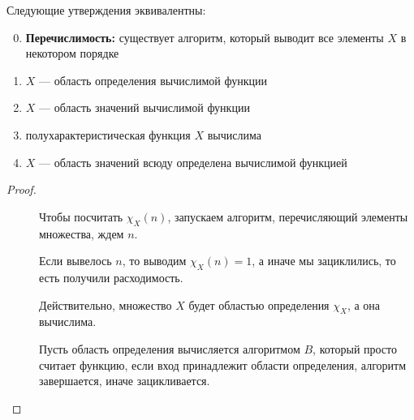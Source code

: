\begin{thm}
    Следующие утверждения эквивалентны:
    \begin{enumerate}
		\setcounter{enumi}{-1}
		\item \textbf{Перечислимость:} существует алгоритм, который выводит все элементы $ X$ в некотором порядке
		\item $ X$ --- область определения вычислимой функции
		\item $ X$ --- область значений вычислимой функции
		\item полухарактеристическая функция $ X$ вычислима
		\item $ X$ --- область значений всюду определена вычислимой функцией
    \end{enumerate} 
\end{thm}
\begin{proof}
    ~\begin{description}
		\item[]
	    Чтобы посчитать $ \chi_{X}(n)$, запускаем алгоритм, перечисляющий элементы множества, ждем $ n$.

	    Если вывелось $ n$, то выводим $ \chi_{X}(n) = 1$, а иначе мы зациклились, то есть получили расходимость.
	\item[] 
	    Действительно, множество $ X$ будет областью определения $ \chi_{X}$, а она вычислима. 
	\item[]
		Пусть область определения вычисляется алгоритмом $ B$, который просто считает функцию, если вход принадлежит области определения, алгоритм завершается, иначе зацикливается.


\end{description}
\end{proof}
